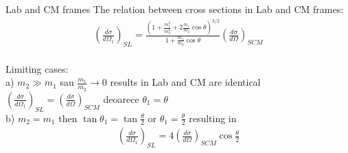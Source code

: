 \begin{frame}{Lab and CM frames}
The relation between cross sections in Lab and CM frames:
\begin{align}
\left(\frac{d\sigma}{d\Omega_1}\right)_{SL}=\frac{(1+\frac{m^2_1}{m^2_2}+2\frac{m_1}{m_2}\cos\theta)^{3/2}}{1+\frac{m_1}{m_2}\cos\theta}\left(\frac{d\sigma}{d\Omega}\right)_{SCM}
\end{align}
\\
Limiting cases:\\
a) $m_2\gg m_1$ sau $\frac{m_1}{m_2} \xrightarrow{}0$ results in Lab and CM are identical $\left(\frac{d\sigma}{d\Omega_1}\right)_{SL}=\left(\frac{d\sigma}{d\Omega}\right)_{SCM}$ deoarece $\theta_1=\theta$\\
b) $m_2=m_1$ then $\tan\theta_1=\tan\frac{\theta}{2}$ or $\theta_1=\frac{\theta}{2}$ resulting in
\begin{align}
\boxed{\left(\frac{d\sigma}{d\Omega_1}\right)_{SL}=4\left(\frac{d\sigma}{d\Omega}\right)_{SCM}\cos\frac{\theta}{2}}
\end{align}

\end{frame} 


